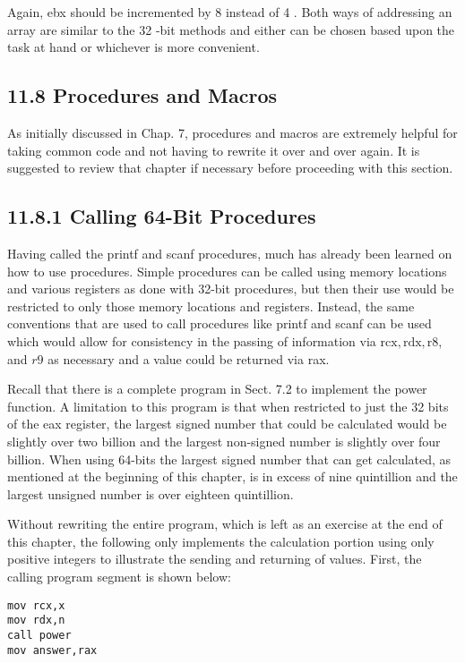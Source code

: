 \documentclass[10pt]{article}
\begin{document}
Again, ebx should be incremented by 8 instead of 4 . Both ways of addressing an array are similar to the 32 -bit methods and either can be chosen based upon the task at hand or whichever is more convenient.

\subsection*{11.8 Procedures and Macros}
As initially discussed in Chap. 7, procedures and macros are extremely helpful for taking common code and not having to rewrite it over and over again. It is suggested to review that chapter if necessary before proceeding with this section.

\subsection*{11.8.1 Calling 64-Bit Procedures}
Having called the printf and scanf procedures, much has already been learned on how to use procedures. Simple procedures can be called using memory locations and various registers as done with 32-bit procedures, but then their use would be restricted to only those memory locations and registers. Instead, the same conventions that are used to call procedures like printf and scanf can be used which would allow for consistency in the passing of information via $\mathrm{rcx}, \mathrm{rdx}, \mathrm{r} 8$, and $r 9$ as necessary and a value could be returned via rax.

Recall that there is a complete program in Sect. 7.2 to implement the power function. A limitation to this program is that when restricted to just the 32 bits of the eax register, the largest signed number that could be calculated would be slightly over two billion and the largest non-signed number is slightly over four billion. When using 64-bits the largest signed number that can get calculated, as mentioned at the beginning of this chapter, is in excess of nine quintillion and the largest unsigned number is over eighteen quintillion.

Without rewriting the entire program, which is left as an exercise at the end of this chapter, the following only implements the calculation portion using only positive integers to illustrate the sending and returning of values. First, the calling program segment is shown below:

\begin{verbatim}
mov rcx,x
mov rdx,n
call power
mov answer,rax
\end{verbatim}
\end{document}
